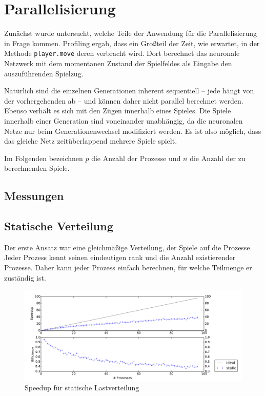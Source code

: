 \section{Parallelisierung}

Zunächst wurde untersucht, welche Teile der Anwendung für die Parallelisierung
in Frage kommen. Profiling ergab, dass ein Großteil der Zeit, wie erwartet, in
der Methode \texttt{player.move} deren verbracht wird. Dort berechnet das
neuronale Netzwerk mit dem momentanen Zustand der Spielfeldes als Eingabe den
auszuführenden Spielzug.

Natürlich sind die einzelnen Generationen inherent sequentiell -- jede hängt von
der vorhergehenden ab -- und können daher nicht parallel berechnet werden. 
Ebenso verhält es sich mit den Zügen innerhalb eines Spieles.
Die Spiele innerhalb einer Generation sind voneinander unabhängig, da die
neuronalen Netze nur beim Generationenwechsel modifiziert werden. Es ist also
möglich, dass das gleiche Netz zeitüberlappend mehrere Spiele spielt.

Im Folgenden bezeichnen $p$ die Anzahl der Prozesse und $n$ die Anzahl der zu
berechnenden Spiele.

\subsection{Messungen}

\subsection{Statische Verteilung}

Der erste Ansatz war eine gleichmäßige Verteilung, der Spiele auf die Prozesse.
Jeder Prozess kennt seinen eindeutigen rank und die Anzahl existierender
Prozesse.  Daher kann jeder Prozess einfach berechnen, für welche Teilmenge er
zuständig ist.

\begin{figure}
    \centering
    \includegraphics[width=\textwidth]
        {content/img/strong_scaling_time_static.pdf}
    \caption{Speedup für statische Lastverteilung}
    \label{fig:speedup_static}
\end{figure}


